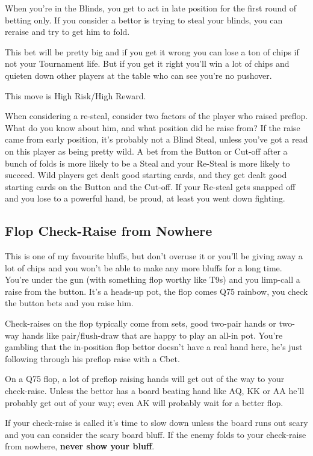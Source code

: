 When you're in the Blinds, you get to act in late position for
the first round of betting only. If you consider a bettor is
trying to steal your blinds, you can reraise and try to
get him to fold.

This bet will be pretty big and if you get it wrong you can
lose a ton of chips if not your Tournament life. But if you get
it right you'll win a lot of chips and quieten down other
players at the table who can see you're no pushover.

This move is High Risk/High Reward.

When considering a re-steal, consider two factors of the player who
raised preflop. What do you know about him, and what position did he
raise from? If the raise came from early position, it's probably not a
Blind Steal, unless you've got a read on this player as being pretty
wild. A bet from the Button or Cut-off after a bunch of folds is more
likely to be a Steal and your Re-Steal is more likely to succeed. Wild
players get dealt good starting cards, and they get dealt good
starting cards on the Button and the Cut-off. If your Re-steal gets
snapped off and you lose to a powerful hand, be proud, at least you
went down fighting.

\subsection{Flop Check-Raise from Nowhere}

This is one of my favourite bluffs, but don't overuse it or you'll be
giving away a lot of chips and you won't be able to make any more
bluffs for a long time. You're under the gun (with something flop
worthy like T9s) and you limp-call a raise from the button. It's
a heads-up pot, the flop comes Q75 rainbow, you check the button bets
and you raise him.

Check-raises on the flop typically come from sets, good two-pair hands
or two-way hands like pair/flush-draw that are happy to play an
all-in pot. You're gambling that the in-position flop bettor doesn't
have a real hand here, he's just following through his preflop raise
with a Cbet.

On a Q75 flop, a lot of preflop raising hands will get out of the way
to your check-raise. Unless the bettor has a board beating hand like
AQ, KK or AA he'll probably get out of your way; even AK will probably
wait for a better flop.

If your check-raise is called it's time to slow down unless the board
runs out scary and you can consider the scary board bluff. If the
enemy folds to your check-raise from nowhere, \textbf{never show your
bluff}.

